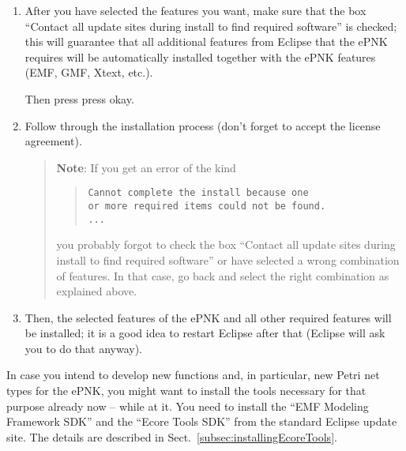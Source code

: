 \begin{enumerate}
      If you want to simulate high-level nets, you should also select
      the feature
      \begin{itemize}
      \item ePNK: HLPNG Simulator~0.1.1  
      \end{itemize}
      from category "HLPNG Simulator".
      
      You will not need the features from the ``ECNO Projects'' category,
      which are a project in their own right (see \cite{Kin12b} for more
      information on the ECNO project). Since they are based on the ePNK, they
      are deployed from the same update site.

\item After you have selected the features you want, make sure that
      the box ``Contact all update sites during
      install to find required software'' is checked; this will guarantee that
      all additional features from Eclipse that the ePNK requires will be
      automatically installed together with the ePNK features (EMF, GMF, Xtext,
      etc.).
      
      Then press press okay.
      
\item Follow through the installation process (don't forget to
      accept the license agreement).
 
      \begin{quote} 
      {\bf Note}:  If you get an error of the kind
      \begin{quote}
      {\tt Cannot complete the install because one\\
           or more required items could not be found.\\
            ... }
      \end{quote}
      you probably forgot to check the box ``Contact all update sites during
      install to find required software'' or have selected a wrong combination
      of features. In that case, go back and select the right combination as
      explained above.
      \end{quote}

\item Then, the selected features of the ePNK and all other required features
      will be installed; it is a good idea to restart Eclipse after that
      (Eclipse will ask you to do that anyway).
\end{enumerate}

In case you intend to develop new functions and, in particular, new Petri net
types for the ePNK, you might want to install the tools necessary for that
purpose already now -- while at it. You need to install the
``EMF Modeling Framework SDK'' and the ``Ecore Tools SDK'' from the standard
Eclipse update site. The details are described in Sect.~\ref{subsec:installingEcoreTools}.%

